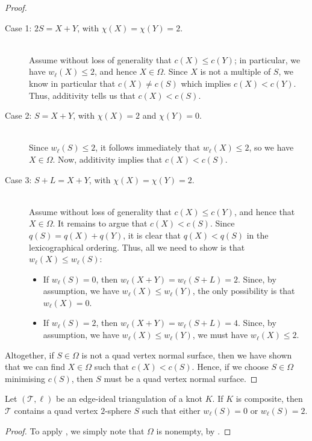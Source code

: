 \documentclass[a4paper,UKenglish,cleveref, autoref, thm-restate]{lipics-v2021}
\newcommand{\tri}{\mathcal{T}}
\begin{document}
\begin{proof}
\begin{description}
\item[Case 1: $2S=X+Y$, with $\chi(X)=\chi(Y)=2$.]\hfill\\
Assume without loss of generality that $c(X) \leqslant c(Y)$;
in particular, we have $w_\ell(X) \leqslant 2$, and hence $X \in \Omega$.
Since $X$ is not a multiple of $S$, we know in particular that $c(X) \neq c(S)$ which implies $c(X) < c(Y)$. Thus, additivity tells us that $c(X) < c(S)$.
\item[Case 2: $S=X+Y$, with $\chi(X)=2$ and $\chi(Y)=0$.]\hfill\\
Since $w_\ell(S) \leqslant 2$, it follows immediately that $w_\ell(X) \leqslant 2$, so we have $X \in \Omega$.
Now, additivity implies that $c(X) < c(S)$.
\item[Case 3: $S+L=X+Y$, with $\chi(X) = \chi(Y) = 2$.]\hfill\\
Assume without loss of generality that $c(X) \leqslant c(Y)$, and hence that $X \in \Omega$.
It remains to argue that $c(X) < c(S)$.
Since $q(S) = q(X) + q(Y)$, it is clear that $q(X) < q(S)$ in the lexicographical ordering.
Thus, all we need to show is that $w_\ell(X) \leqslant w_\ell(S)$:
	\begin{itemize}
	\item If $w_\ell(S) = 0$, then $w_\ell(X+Y) = w_\ell(S+L) = 2$.
	Since, by assumption, we have $w_\ell(X) \leqslant w_\ell(Y)$, the only possibility is that $w_\ell(X) = 0$.
	\item If $w_\ell(S) = 2$, then $w_\ell(X+Y) = w_\ell(S+L) = 4$.
	Since, by assumption, we have $w_\ell(X) \leqslant w_\ell(Y)$, we must have $w_\ell(X) \leqslant 2$.
	\end{itemize}
\end{description}

Altogether, if $S \in \Omega$ is not a quad vertex normal surface, then we have shown that we can find $X \in \Omega$ such that $c(X) < c(S)$.
Hence, if we choose $S \in \Omega$ minimising $c(S)$, then $S$ must be
a quad vertex normal surface.
\end{proof}

\begin{corollary}\label{cor:quadVertexComposite}
Let $(\tri,\ell)$ be an edge-ideal triangulation of a knot $K$.
If $K$ is composite, then $\tri$ contains a quad vertex $2$-sphere $S$ such that either $w_\ell(S)=0$ or $w_\ell(S)=2$.
\end{corollary}

\begin{proof}
To apply , we simply note that $\Omega$ is nonempty, by .
\end{proof}
\end{document}
